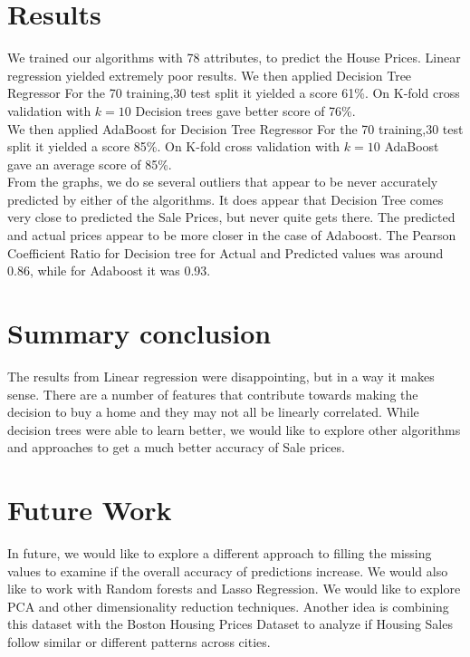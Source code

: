\documentclass[fleqn,10pt]{SelfArx} %
\begin{document}
	
	\section{Results}
	We trained our algorithms with 78 attributes, to predict the House Prices. Linear regression yielded extremely poor results. We then applied Decision Tree Regressor For the 70 training,30 test split it yielded a score 61\%. On K-fold cross validation with $k=10$ Decision trees gave better score of 76\%.\\
	
	We then applied AdaBoost for Decision Tree Regressor For the 70 training,30 test split it yielded a score 85\%. On K-fold cross validation with $k=10$ AdaBoost gave an average score of 85\%.\\
	
	From the graphs, we do se several outliers that appear to be never accurately predicted by either of the algorithms. It does appear that Decision Tree comes very close to predicted the Sale Prices, but never quite gets there. The predicted and actual prices appear to be more closer in the case of Adaboost. The Pearson Coefficient Ratio for Decision tree for Actual and Predicted values was around 0.86, while for Adaboost it was 0.93. 
	
	 
	\section{Summary conclusion}
	The results from Linear regression were disappointing, but in a way it makes sense. There are a number of features that contribute towards making the decision to buy a home and they may not all be linearly correlated. While decision trees were able to learn better, we would like to explore other algorithms and approaches to get a much better accuracy of Sale prices.
	\section{Future Work}
	In future, we would like to explore a different approach to filling the missing values to examine if the overall accuracy of predictions increase. We  would also like to work with Random forests and Lasso Regression. We would like to explore PCA and other dimensionality reduction techniques. Another idea is combining this dataset with the Boston Housing Prices Dataset to analyze if Housing Sales follow similar or different patterns across cities.
	
\end{document}
